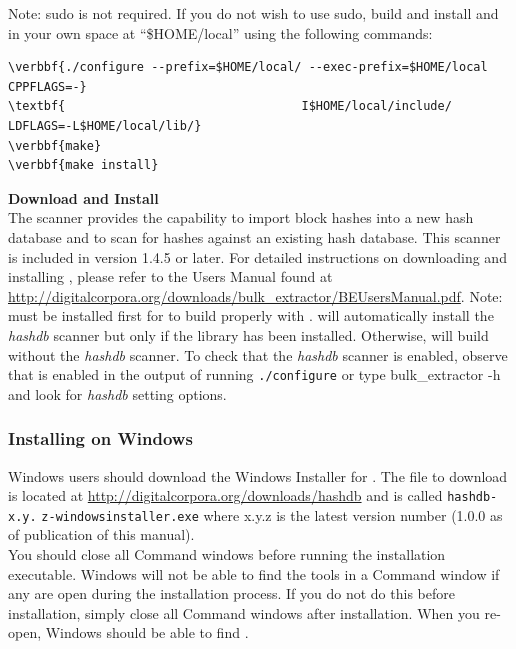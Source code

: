 \documentclass[11pt,fleqn]{article} %
\begin{document}
Note: sudo is not required. If you do not wish to use sudo,  build and install \hash and \bulk in your own space at ``\$HOME/local'' using the following commands:
\begin{Verbatim}[commandchars=\\\{\}]
\verbbf{./configure --prefix=$HOME/local/ --exec-prefix=$HOME/local CPPFLAGS=-}
\textbf{                                 I$HOME/local/include/ LDFLAGS=-L$HOME/local/lib/}
\verbbf{make}
\verbbf{make install}
\end{Verbatim}
\textbf{Download and Install \bulk}\\
The \bulk \hash scanner provides the capability to import block hashes into a new hash database and to scan for hashes against an existing hash database.
This scanner is included in \bulk version 1.4.5 or later. For detailed instructions on downloading and installing \bulk, please refer to the Users Manual found at \url{http://digitalcorpora.org/downloads/bulk_extractor/BEUsersManual.pdf}. Note: \hash must be installed first for \bulk to build properly with \hash. \bulk will automatically install the \textit{hashdb} scanner but only if the \hash library has been installed. Otherwise, \bulk will build without the \textit{hashdb} scanner. To check that the \textit{hashdb} scanner is enabled, observe that is enabled in the output of running \texttt{./configure} or type {bulk\_extractor -h} and look for \textit{hashdb} setting options.

\subsubsection{Installing on Windows}
\label{InstallingOnWindows}
Windows users should download the Windows Installer for \hash. The file to download is located at \url{http://digitalcorpora.org/downloads/hashdb} and is called \texttt{hashdb-x.y.} \texttt{z-windowsinstaller.exe} where x.y.z is the latest version number (1.0.0 as of publication of this manual).\\

You should close all Command windows before running the installation executable. Windows will not be able to find the \hash tools in a Command window if any are open during the installation process. If you do not do this before installation, simply close all Command windows after installation. When you re-open, Windows should be able to find \hash.\\
\end{document}
